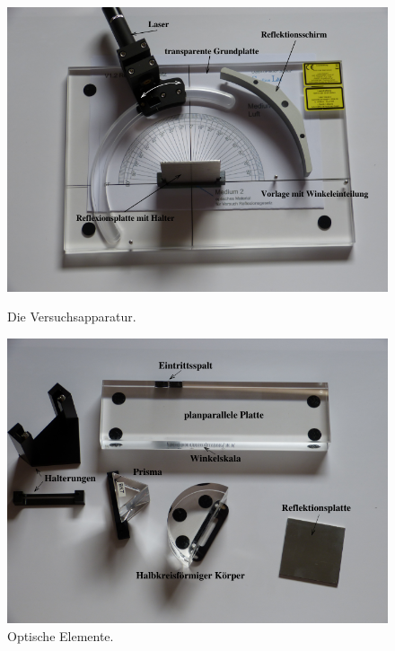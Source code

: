 \begin{figure}[H]
  \begin{minipage}[b]{.55\linewidth} %
     \includegraphics[width=\linewidth]{pictures/Aufbau.png}
     \caption{Die Versuchsapparatur. \cite{AP01}}
     \label{fig:Aufbau}
  \end{minipage}
  \begin{minipage}[b]{.55\linewidth} %
     \includegraphics[width=\linewidth]{pictures/Teile.png}
     \caption{Optische Elemente. \cite{AP01}}
     \label{fig:Teile}
  \end{minipage}
\end{figure}

